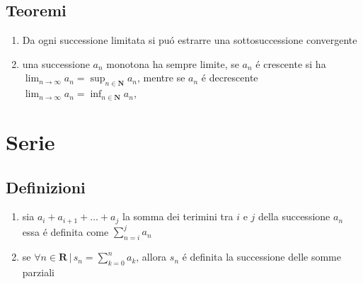 \documentclass{exam}
\begin{document}
  
  \subsection{Teoremi}
    \begin{enumerate}
      \item Da ogni successione limitata si pu\'o estrarre una sottosuccessione convergente
      \item una successione $a_{n}$ monotona ha sempre limite, se $a_{n}$ \'e crescente si ha 
      \(\displaystyle \lim_{n\to \infty}a_{n}= \sup_{n\in \mathbf{N}}a_{n}\),
      mentre se $a_{n}$ \'e decrescente
      \(\displaystyle \lim_{n\to \infty}a_{n}= \inf_{n\in \mathbf{N}}a_{n}\),
    \end{enumerate}





\section{Serie}
 \subsection{Definizioni}
  \begin{enumerate}
    \item
      sia $a_{i}+a_{i+1}+\dots+a_{j}$ la somma dei terimini tra $i$ e $j$ della successione $a_{n}$ essa \'e definita come \(\displaystyle \sum_{n=i}^j a_{n}\)
    \item
      se \(\displaystyle \forall n\in \mathbf{R}\,|\, s_{n}=\sum_{k=0}^n a_{k}\), allora $s_{n}$ \'e definita la successione delle somme parziali
  \end{enumerate}
 
 
\end{document}
